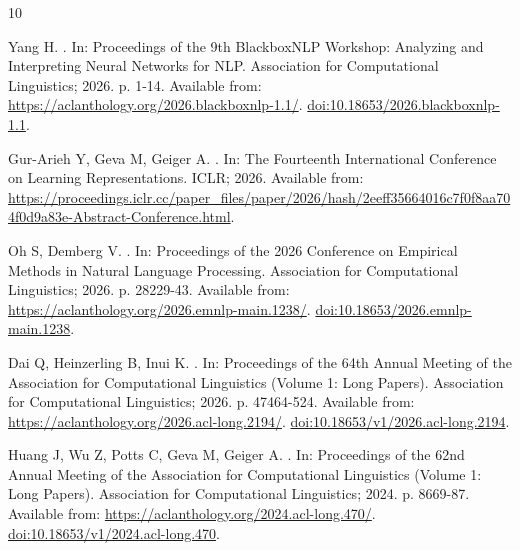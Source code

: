 \documentclass[10pt,letterpaper]{article}
\begin{document}
\nolinenumbers
\begin{thebibliography}{10}

Yang H.
.
\newblock In: Proceedings of the 9th BlackboxNLP Workshop: Analyzing and
  Interpreting Neural Networks for NLP. Association for Computational
  Linguistics; 2026. p. 1-14.
\newblock Available from: \url{https://aclanthology.org/2026.blackboxnlp-1.1/}.
  \href {http://dx.doi.org/10.18653/2026.blackboxnlp-1.1}
  {doi:10.18653/2026.blackboxnlp-1.1}.

Gur-Arieh Y, Geva M, Geiger A.
.
\newblock In: The Fourteenth International Conference on Learning
  Representations. ICLR; 2026. Available from:
  \url{https://proceedings.iclr.cc/paper_files/paper/2026/hash/2eeff35664016c7f0f8aa704f0d9a83e-Abstract-Conference.html}.

Oh S, Demberg V.
.
\newblock In: Proceedings of the 2026 Conference on Empirical Methods in
  Natural Language Processing. Association for Computational Linguistics; 2026.
  p. 28229-43.
\newblock Available from: \url{https://aclanthology.org/2026.emnlp-main.1238/}.
  \href {http://dx.doi.org/10.18653/2026.emnlp-main.1238}
  {doi:10.18653/2026.emnlp-main.1238}.

Dai Q, Heinzerling B, Inui K.
.
\newblock In: Proceedings of the 64th Annual Meeting of the Association for
  Computational Linguistics (Volume 1: Long Papers). Association for
  Computational Linguistics; 2026. p. 47464-524.
\newblock Available from: \url{https://aclanthology.org/2026.acl-long.2194/}.
  \href {http://dx.doi.org/10.18653/v1/2026.acl-long.2194}
  {doi:10.18653/v1/2026.acl-long.2194}.

Huang J, Wu Z, Potts C, Geva M, Geiger A.
.
\newblock In: Proceedings of the 62nd Annual Meeting of the Association for
  Computational Linguistics (Volume 1: Long Papers). Association for
  Computational Linguistics; 2024. p. 8669-87.
\newblock Available from: \url{https://aclanthology.org/2024.acl-long.470/}.
  \href {http://dx.doi.org/10.18653/v1/2024.acl-long.470}
  {doi:10.18653/v1/2024.acl-long.470}.


\end{thebibliography}
\end{document}
